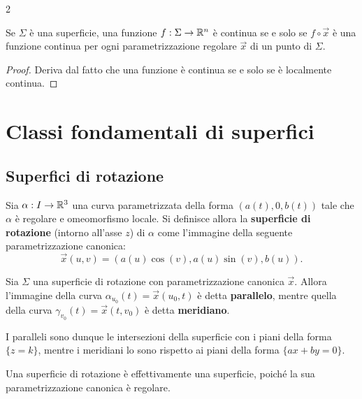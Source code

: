 \begin{multicols*}{2}
    \begin{proposition}
        Se $\Sigma$ è una superficie, una funzione $f : \Sigma \to \mathbb{R}^n$ è
        continua se e solo se $f \circ \vec{x}$ è una funzione continua
        per ogni parametrizzazione regolare $\vec{x}$ di un punto di $\Sigma$.
    \end{proposition}

    \begin{proof}
        Deriva dal fatto che una funzione è continua se e solo se è
        localmente continua.
    \end{proof}

    \section{Classi fondamentali di superfici}

    \subsection{Superfici di rotazione}
    \begin{definition}
        Sia $\alpha : I \to \mathbb{R}^3$ una curva parametrizzata della forma
        $(a(t), 0, b(t))$ tale che $\alpha$ è regolare e omeomorfismo locale.
        Si definisce allora la \textbf{superficie di rotazione} (intorno
        all'asse $z$) di $\alpha$ come l'immagine della seguente
        parametrizzazione canonica:
        \[
            \vec{x}(u, v) = (a(u) \cos(v), a(u) \sin(v), b(u)).
        \]
    \end{definition}

    \begin{definition}
        Sia $\Sigma$ una superficie di rotazione con parametrizzazione canonica
        $\vec{x}$. Allora l'immagine della curva $\alpha_{u_0}(t) = \vec{x}(u_0, t)$
        è detta \textbf{parallelo}, mentre quella della curva
        $\gamma_{v_0}(t) = \vec{x}(t, v_0)$ è detta \textbf{meridiano}. \smallskip

        I paralleli sono dunque le intersezioni della superficie con i piani della
        forma $\{z = k\}$, mentre i meridiani lo sono rispetto ai piani della
        forma $\{ ax + by = 0 \}$.
    \end{definition}

    \begin{proposition}
        Una superficie di rotazione è effettivamente una superficie, poiché
        la sua parametrizzazione canonica è regolare.
    \end{proposition}


\end{multicols*}
